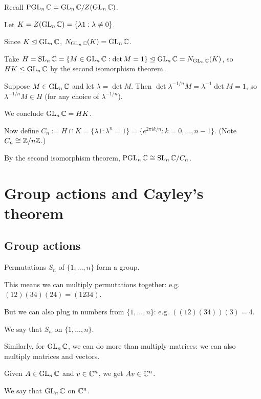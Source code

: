 \documentclass[12pt,letterpaper]{report}
\begin{document}
\begin{ex}
  Recall $\operatorname{PGL}_n\mathbb{C} = \operatorname{GL}_n\mathbb{C} / Z(\operatorname{GL}_n\mathbb{C})$.

  Let $K = Z(\operatorname{GL}_n\mathbb{C}) = \{\lambda 1 : \lambda \neq 0\}$.

  Since $K \trianglelefteq \operatorname{GL}_n\mathbb{C}$, $N_{\operatorname{GL}_n\mathbb{C}}(K) = \operatorname{GL}_n\mathbb{C}$.

  Take $H = \operatorname{SL}_n\mathbb{C} = \{M \in \operatorname{GL}_n\mathbb{C} : \det M = 1\}
    \trianglelefteq \operatorname{GL}_n\mathbb{C} = N_{\operatorname{GL}_n\mathbb{C}}(K)$, so $HK \leq \operatorname{GL}_n\mathbb{C}$ by the
  second isomorphism theorem.

  Suppose $M \in \operatorname{GL}_n\mathbb{C}$ and let $\lambda = \det M$.
  Then $\det \lambda^{-1/n}M = \lambda^{-1} \det M = 1$, so $\lambda^{-1/n}M \in H$ (for any
  choice of $\lambda^{-1/n}$).

  We conclude $\operatorname{GL}_n\mathbb{C} = HK$.

  Now define $C_n := H \cap K = \{\lambda 1 : \lambda^n = 1\}
    = \{e^{2\pi i k/n} : k = 0, \ldots, n - 1\}$.
  (Note $C_n \cong \mathbb{Z}/{n}\mathbb{Z}$.)

  By the second isomorphism theorem, $\operatorname{PGL}_n\mathbb{C} \cong \operatorname{SL}_n\mathbb{C}/C_n$.
\end{ex}


\section{Group actions and Cayley's theorem}

\subsection{Group actions}

\begin{ex}
  Permutations $S_n$ of $\{1, \ldots, n\}$ form a group.

  This means we can multiply permutations together: e.g. $(12)(34)(24) = (1234)$.

  But we can also plug in numbers from $\{1, \ldots, n\}$: e.g. $((12)(34))(3) = 4$.

  We say that $S_n$  on $\{1, \ldots, n\}$.
\end{ex}

\begin{ex}
  Similarly, for $\operatorname{GL}_n\mathbb{C}$, we can do more than multiply matrices: we can also multiply
  matrices and vectors.

  Given $A \in \operatorname{GL}_n\mathbb{C}$ and $v \in \mathbb{C}^n$, we get $Av \in \mathbb{C}^n$.

  We say that $\operatorname{GL}_n\mathbb{C}$  on $\mathbb{C}^n$.
\end{ex}
\end{document}
